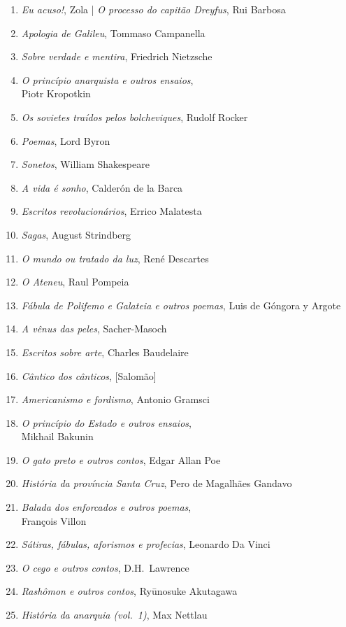 \begin{enumerate}
\item \textit{Eu acuso!}, Zola | \textit{O processo do capitão Dreyfus}, Rui Barbosa
\item \textit{Apologia de Galileu}, Tommaso Campanella 
\item \textit{Sobre verdade e mentira}, Friedrich Nietzsche
\item \textit{O princípio anarquista e outros ensaios}, \\Piotr Kropotkin
\item \textit{Os sovietes traídos pelos bolcheviques}, Rudolf Rocker
\item \textit{Poemas}, Lord Byron
\item \textit{Sonetos}, William Shakespeare
\item \textit{A vida é sonho}, Calderón de la Barca
\item \textit{Escritos revolucionários}, Errico Malatesta
\item \textit{Sagas}, August Strindberg
\item \textit{O mundo ou tratado da luz}, René Descartes
\item \textit{O Ateneu}, Raul Pompeia
\item \textit{Fábula de Polifemo e Galateia e outros poemas}, Luis de Góngora y Argote
\item \textit{A vênus das peles}, Sacher-Masoch
\item \textit{Escritos sobre arte}, Charles Baudelaire
\item \textit{Cântico dos cânticos}, [Salomão]
\item \textit{Americanismo e fordismo}, Antonio Gramsci
\item \textit{O princípio do Estado e outros ensaios},\\ Mikhail Bakunin
\item \textit{O gato preto e outros contos}, Edgar Allan Poe
\item \textit{História da província Santa Cruz}, Pero de Magalhães Gandavo
\item \textit{Balada dos enforcados e outros poemas},\\ François Villon
\item \textit{Sátiras, fábulas, aforismos e profecias}, Leonardo Da Vinci
\item \textit{O cego e outros contos}, D.H.~Lawrence
\item \textit{Rashômon e outros contos}, Ryūnosuke Akutagawa
\item \textit{História da anarquia (vol.~1)}, Max Nettlau

\end{enumerate}
